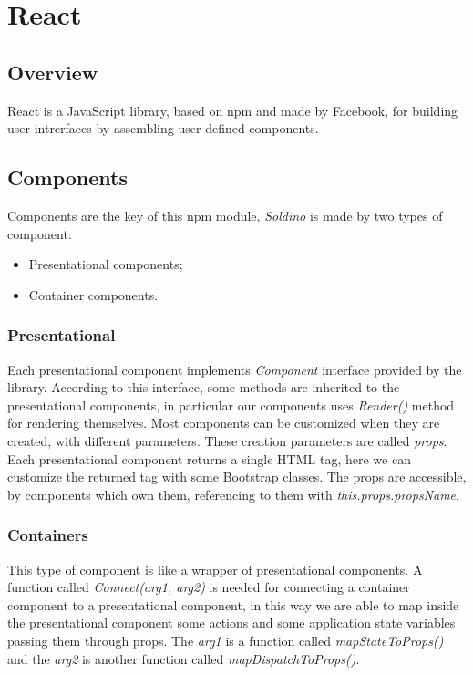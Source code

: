 \section{React} 

\subsection{Overview}
React is a JavaScript library, based on npm and made by Facebook, for building user intrerfaces by assembling user-defined components.
\subsection{Components}
Components are the key of this npm module, \textit{Soldino} is made by two types of component:
\begin{itemize}
	\item Presentational components;
	\item Container components.
\end{itemize}
\subsubsection{Presentational}
Each presentational component implements \textit{Component} interface provided by the library. According to this interface, some methods are inherited to the presentational components, in particular our components uses \textit{Render()} method for rendering themselves.
Most components can be customized when they are created, with different parameters. These creation parameters are called \textit{props}. Each presentational component returns a single HTML tag, here we can customize the returned tag with some Bootstrap classes. The props are accessible, by components which own them, referencing to them with \textit{this.props.propsName}.

\subsubsection{Containers} 
This type of component is like a wrapper of presentational components. A function called \textit{Connect(arg1, arg2)} is needed for connecting a container component to a presentational component, in this way we are able to map inside the presentational component some actions and some application state variables passing them through props. The \textit{arg1} is a function called \textit{mapStateToProps()} and the \textit{arg2} is another function called \textit{mapDispatchToProps()}.
